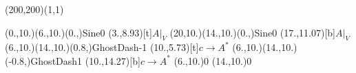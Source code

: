 \unitlength=1bp%

\begin{feynartspicture}(200,200)(1,1)

\FADiagram{}
\FAProp(0.,10.)(6.,10.)(0.,){Sine}{0}
\FALabel(3.,8.93)[t]{$A|_V$}
\FAProp(20,10.)(14.,10.)(0.,){Sine}{0}
\FALabel(17.,11.07)[b]{$A|_V$}
\FAProp(6.,10.)(14.,10.)(0.8,){GhostDash}{-1}
\FALabel(10.,5.73)[t]{$c\to A^*$}
\FAProp(6.,10.)(14.,10.)(-0.8,){GhostDash}{1}
\FALabel(10.,14.27)[b]{$c\to A^*$}
\FAVert(6.,10.){0}
\FAVert(14.,10.){0}
\end{feynartspicture}

